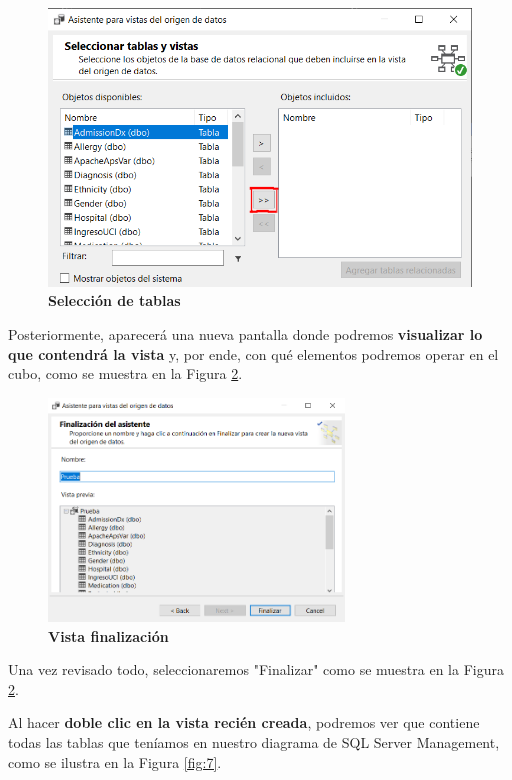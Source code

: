 \documentclass[12pt, a4paper, twoside]{article}
\begin{document}
\begin{figure}[H]
	\centering
	\includegraphics[width=1\textwidth]{image/seleccionTablas}
	\caption{\textbf{Selección de tablas}}
	\label{fig:5}
\end{figure}

Posteriormente, aparecerá una nueva pantalla donde podremos \textbf{visualizar lo que contendrá la vista} y, por ende, con qué elementos podremos operar en el cubo, como se muestra en la Figura \ref{fig:6}.

\begin{figure}[H]
	\centering
	\includegraphics[width=0.7\textwidth]{image/asistenteVista}
	\caption{\textbf{Vista finalización}}
	\label{fig:6}
\end{figure}

Una vez revisado todo, seleccionaremos "Finalizar" como se muestra en la Figura \ref{fig:6}.

Al hacer \textbf{doble clic en la vista recién creada}, podremos ver que contiene todas las tablas que teníamos en nuestro diagrama de SQL Server Management, como se ilustra en la Figura \ref{fig:7}.
\end{document}
